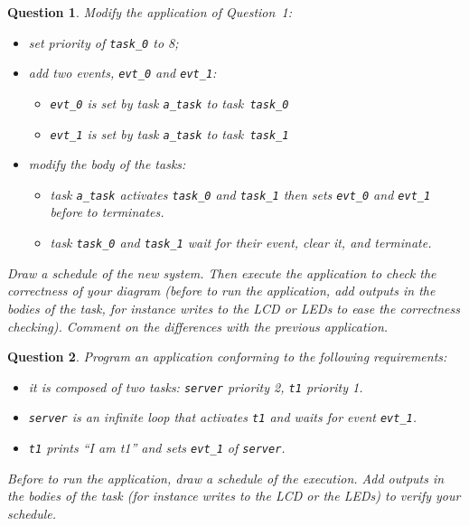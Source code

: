 \documentclass[11pt]{report}
\newtheorem{ex}{Question}
\begin{document}
\begin{ex}
     Modify the application of Question~1:
\begin{itemize}
    \item set priority of \texttt{task_0} to 8;
    \item add two events, \texttt{evt\_0} and \texttt{evt\_1}:
        \begin{itemize}
            \item \texttt{evt_0} is set by task \texttt{a\_task} to task \texttt{task\_0}
            \item \texttt{evt_1} is set by task \texttt{a\_task} to task \texttt{task\_1}
        \end{itemize}
    \item modify the body of the tasks:
        \begin{itemize}
            \item task \texttt{a\_task} activates \texttt{task\_0} and \texttt{task\_1} then sets \texttt{evt\_0} and \texttt{evt\_1} before to terminates.
            \item task \texttt{task\_0} and \texttt{task\_1} wait for their event, clear it, and terminate.
        \end{itemize}
\end{itemize}

Draw a schedule of the new system.
Then execute the application to check the correctness of your diagram (before to run the application, add outputs in the bodies of the task, for instance writes to the LCD or LEDs to ease the correctness checking).
Comment on the differences with the previous application.

\end{ex}

\begin{ex}
Program an application conforming to the following requirements:

\begin{itemize}
    \item it is composed of two tasks: \texttt{server} priority 2, \texttt{t1} priority 1.
    \item \texttt{server} is an infinite loop that activates \texttt{t1} and waits for event \texttt{evt_1}.
    \item \texttt{t1} prints ``I am t1'' and sets \texttt{evt_1} of \texttt{server}.
\end{itemize}

Before to run the application, draw a schedule of the execution. Add outputs in the bodies of the task (for instance writes to the LCD or the LEDs) to verify your schedule.
\end{ex}
\end{document}
